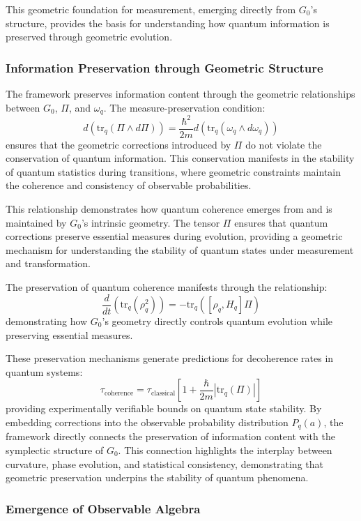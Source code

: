 \documentclass[10pt]{article}
\begin{document}
This geometric foundation for measurement, emerging directly from $G_0$'s structure, provides the basis for understanding how quantum information is preserved through geometric evolution.

\subsubsection{Information Preservation through Geometric Structure}

The framework preserves information content through the geometric relationships between $G_0$, \( \Pi \), and \( \omega_q \). The measure-preservation condition:
\[
   d(\text{tr}_q(\Pi \wedge d\Pi)) = \frac{\hbar^2}{2m}d(\text{tr}_q(\omega_q \wedge d\omega_q))
\]
ensures that the geometric corrections introduced by \( \Pi \) do not violate the conservation of quantum information. This conservation manifests in the stability of quantum statistics during transitions, where geometric constraints maintain the coherence and consistency of observable probabilities.

This relationship demonstrates how quantum coherence emerges from and is maintained by $G_0$'s intrinsic geometry. The tensor \( \Pi \) ensures that quantum corrections preserve essential measures during evolution, providing a geometric mechanism for understanding the stability of quantum states under measurement and transformation.

The preservation of quantum coherence manifests through the relationship:
\[
   \frac{d}{dt}(\text{tr}_q(\rho_q^2)) = -\text{tr}_q([\rho_q, H_q]\Pi)
\]
demonstrating how $G_0$'s geometry directly controls quantum evolution while preserving essential measures.

These preservation mechanisms generate predictions for decoherence rates in quantum systems:
\[
   \tau_{\text{coherence}} = \tau_{\text{classical}}\left[1 + \frac{\hbar}{2m}|\text{tr}_q(\Pi)|\right]
\]
providing experimentally verifiable bounds on quantum state stability. By embedding corrections into the observable probability distribution \( P_q(a) \), the framework directly connects the preservation of information content with the symplectic structure of $G_0$. This connection highlights the interplay between curvature, phase evolution, and statistical consistency, demonstrating that geometric preservation underpins the stability of quantum phenomena.

\subsubsection{Emergence of Observable Algebra}
\end{document}
